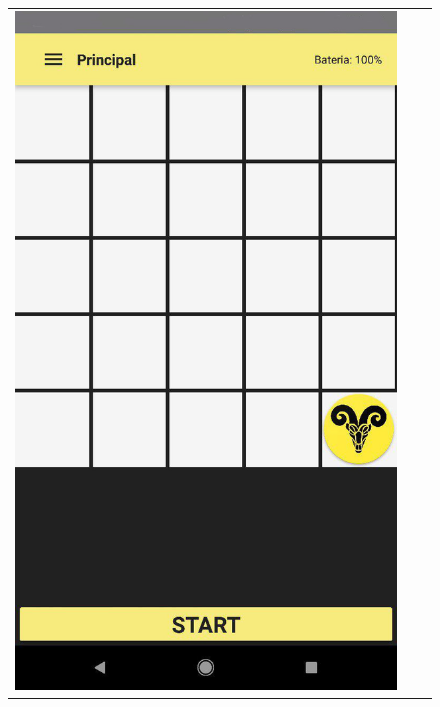 \begin{figure}[h!]
\begin{tabular}{ccc}
  \includegraphics[scale=0.20]{img/App2.jpg}
&

\end{tabular}
\end{figure}
